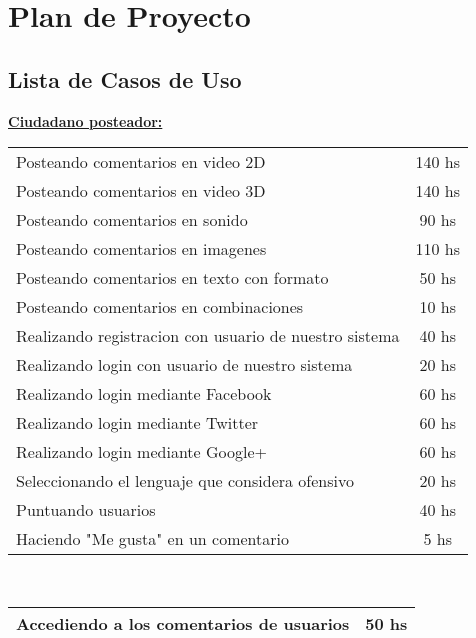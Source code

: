 \section{Plan de Proyecto}
\subsection{Lista de Casos de Uso}

\uline{\bf{\large{Ciudadano posteador:}}}\\
\begin{center}
\begin{tabular}{||l | c||} \hline \hline
Posteando comentarios en video 2D     &                  140 hs\\
Posteando comentarios en video 3D      &                 140 hs\\
Posteando comentarios en sonido         &                90 hs\\
Posteando comentarios en imagenes        &               110 hs\\
Posteando comentarios en texto con formato &             50 hs\\
Posteando comentarios en combinaciones      &            10 hs\\
Realizando registracion con usuario de nuestro sistema & 40 hs\\
Realizando login con usuario de nuestro sistema &        20 hs\\
Realizando login mediante Facebook               &       60 hs\\
Realizando login mediante Twitter                 &      60 hs\\
Realizando login mediante Google+                  &     60 hs\\
Seleccionando el lenguaje que considera ofensivo    &    20 hs\\
Puntuando usuarios                                   &   40 hs\\
Haciendo "Me gusta" en un comentario               &     5 hs\\ \hline  \hline
\end{tabular}
\end{center}

\\
\begin{center}
\begin{tabular}{||l | c||} \hline  \hline
Accediendo a los comentarios de usuarios       &        50 hs\\ \hline \hline
\end{tabular}
\end{center}

